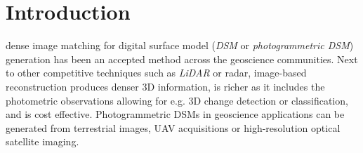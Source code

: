 \documentclass[journal]{IEEEtran}
\begin{document}
\section{Introduction}
% 
% 
 dense image matching for digital surface model (\textit{DSM} or \textit{photogrammetric DSM}) generation has been an accepted method across the geoscience communities. Next to other competitive techniques such as \textit{LiDAR} or radar, image-based reconstruction produces denser 3D information, is richer as it includes the photometric observations allowing for e.g. 3D change detection or classification, and is cost effective. %
Photogrammetric DSMs in geoscience applications can be generated from terrestrial images, UAV acquisitions or high-resolution optical satellite imaging. 
\end{document}
